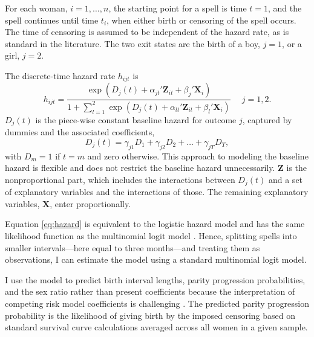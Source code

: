 \documentclass[12pt,letterpaper]{article}
\begin{document}
For each woman, $i=1,\ldots,n$, the starting point for a spell is time $t=1$, and 
the spell continues until time $t_i$, when either birth or censoring of the spell 
occurs.
The time of censoring is assumed to be independent of the hazard rate,
as is standard in the literature.
The two exit states are the birth of a boy, $j=1$, or a girl, $j=2$.

The discrete-time hazard rate $h_{ijt}$ is 
\begin{equation}
 h_{ijt} = \frac{\exp(D_j(t) + \alpha_{jt}'\mathbf{Z}_{it} + \beta_j'\mathbf{X}_{i})} 
 {1 + \sum_{l=1}^2 \exp(D_j(t) + \alpha_{lt}'\mathbf{Z}_{it} + \beta_l'\mathbf{X}_{i})} \: \: \; \; \;  j = 1,2.
 \label{eq:hazard}
\end{equation}
$D_{j}(t)$ is the piece-wise constant baseline hazard for outcome $j$, captured
by dummies and the associated coefficients,
\begin{equation}
D_j(t) = \gamma_{j1} D_1 + \gamma_{j2} D_2 + \ldots + \gamma_{jT} D_T,
\end{equation}
with $D_m = 1$ if $t=m$ and zero otherwise.
This approach to modeling the baseline hazard is flexible and does not restrict the 
baseline hazard unnecessarily.
$\mathbf{Z}$ is the nonproportional part, which includes the interactions between 
$D_j(t)$ and a set of explanatory variables and the interactions of those.
The remaining explanatory variables, $\mathbf{X}$, enter proportionally.




Equation \ref{eq:hazard} is equivalent to the logistic hazard model and has the same 
likelihood function as the multinomial logit model \citep{allison82,jenkins95}.
Hence, splitting spells into smaller intervals---here equal to three months---and 
treating them as observations, I can estimate the model using a standard multinomial 
logit model. 

I use the model to predict birth interval lengths, parity progression probabilities, 
and the sex ratio rather than present coefficients because the interpretation 
of competing risk model coefficients is challenging \citep{thomas96}.
The predicted parity progression probability is the likelihood of giving birth by the
imposed censoring based on standard survival curve calculations averaged across all
women in a given sample.
\end{document}
